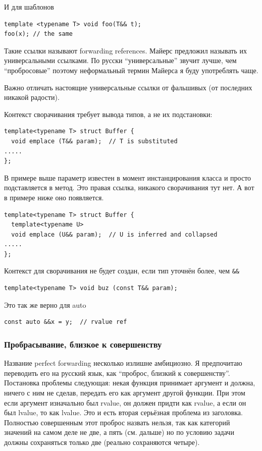 \documentclass[a4paper,12pt,oneside]{article}
\begin{document}
И для шаблонов

\begin{lstlisting}
template <typename T> void foo(T&& t);
foo(x); // the same
\end{lstlisting}

Такие ссылки называют forwarding references. Майерс предложил называть их универсальными ссылками. По русски ``универсальные'' звучит лучше, чем ``пробросовые'' поэтому неформальный термин Майерса я буду употреблять чаще.

Важно отличать настоящие универсальные ссылки от фальшивых (от последних никакой радости).

Контекст сворачивания требует вывода типов, а не их подстановки:

\begin{lstlisting}
template<typename T> struct Buffer {
  void emplace (T&& param);  // T is substituted
.....
};
\end{lstlisting}

В примере выше параметр известен в момент инстанцирования класса и просто подставляется в метод. Это правая ссылка, никакого сворачивания тут нет. А вот в примере ниже оно появляется.

\begin{lstlisting}
template<typename T> struct Buffer {
  template<typename U>
  void emplace (U&& param);  // U is inferred and collapsed
.....
};
\end{lstlisting}

Контекст для сворачивания не будет создан, если тип уточнён более, чем \lstinline!&&!

\begin{lstlisting}
template<typename T> void buz (const T&& param); 
\end{lstlisting}

Это так же верно для auto

\begin{lstlisting}
const auto &&x = y;  // rvalue ref 
\end{lstlisting}

\subsubsection{Пробрасывание, близкое к совершенству}

Название perfect forwarding несколько излишне амбициозно. Я предпочитаю переводить его на русский язык, как ``проброс, близкий к совершенству''. Постановка проблемы следующая: некая функция принимает аргумент и должна, ничего с ним не сделав, передать его как аргумент другой функции. При этом если аргумент изначально был rvalue, он должен придти как rvalue, а если он был lvalue, то как lvalue. Это и есть вторая серьёзная проблема из заголовка. Полностью совершенным этот проброс назвать нельзя, так как категорий значений на самом деле не две, а пять (см. дальше) но по условию задачи должны сохраняться только две (реально сохраняются четыре).
\end{document}
